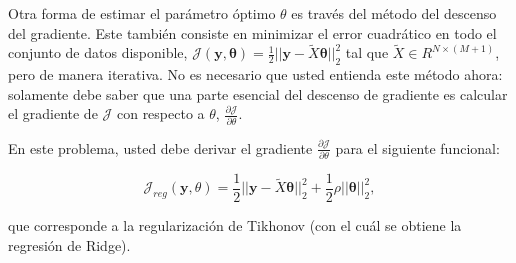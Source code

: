 \documentclass[letterpaper,11pt]{article}
\theoremstyle{plain}
\theoremstyle{definition}
\newcommand{\1}{\mathbbm{1}}
\begin{document}
\begin{enumerate}[label=\alph*)]
    Otra forma de estimar el  parámetro óptimo $\theta$ es través del método del descenso del gradiente. 
    Este también consiste en minimizar el error cuadrático en todo el conjunto de datos disponible, 
    $\mathcal{J}(\mathbf{y}, \mathbf{\theta}) = \frac{1}{2} || \mathbf{y} - \tilde{X} \mathbf{\theta} ||_2^2$ tal que $\tilde{X} \in R^{N\times (M+1)}$, pero de manera iterativa. 
    No es necesario que usted entienda este método ahora: solamente debe saber que una parte esencial del descenso de gradiente es calcular el gradiente de $\mathcal{J}$ con respecto a $\theta$, $\frac{\partial \mathcal{J}}{\partial\theta}$.
    
    En este problema, usted debe derivar el gradiente $\frac{\partial \mathcal{J}}{\partial\theta}$ para el siguiente funcional:
    
    $$
        \mathcal{J}_{reg}(\mathbf{y}, \theta) = \frac{1}{2} ||\mathbf{y} - \tilde{X} \mathbf{\theta}||_2^2 + \frac{1}{2} \rho ||\mathbf{\theta}||_2^2,
    $$
    
    que corresponde a la regularización de Tikhonov (con el cuál se obtiene la regresión de Ridge).
    
    
    
    


\end{enumerate} 

\vspace{5mm}






\end{document}
